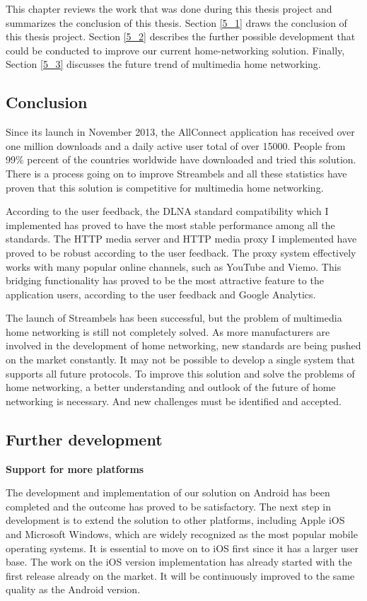 This chapter reviews the work that was done during this thesis project and
summarizes the conclusion of this thesis. Section \ref{5_1} draws the
conclusion of this thesis project. Section \ref{5_2} describes the further
possible development that could be conducted to improve our current
home-networking solution. Finally, Section \ref{5_3} discusses the future trend
of multimedia home networking.
\subsection{Conclusion\label{5_1}}
Since its launch in November 2013, the AllConnect application has received over
one million downloads and a daily active user total of over 15000. People from 99\%
percent of the countries worldwide have downloaded and tried this solution.
There is a process going on to improve Streambels and all these
statistics have proven that this solution is competitive for multimedia home
networking.

According to the user feedback, the DLNA standard compatibility which I
implemented has proved to have the most stable performance among all the
standards. The HTTP media server and HTTP media proxy I implemented have proved
to be robust according to the user feedback. The proxy system effectively works
with many popular online channels, such as YouTube and Viemo. This bridging
functionality has proved to be the most attractive feature to the application
users, according to the user feedback and Google Analytics.

The launch of Streambels has been successful, but the problem of multimedia home
networking is still not completely solved. As more manufacturers are involved
in the development of home networking, new standards are being pushed on the
market constantly. It may not be possible to develop a single system that
supports all future protocols. To improve this solution and solve the problems
of home networking, a better understanding and outlook of the future of home
networking is necessary. And new challenges must be identified and accepted.
\clearpage
\subsection{Further development\label{5_2}}
\textbf{Support for more platforms}

The development and implementation of our solution on Android has been completed
and the outcome has proved to be satisfactory. The next step in development is
to extend the solution to other platforms, including Apple iOS and Microsoft
Windows, which are widely recognized as the most popular mobile operating
systems. It is essential to move on to iOS first since it has a larger user
base. The work on the iOS version implementation has already started with the
first release already on the market. It will be continuously improved
to the same quality as the Android version.

